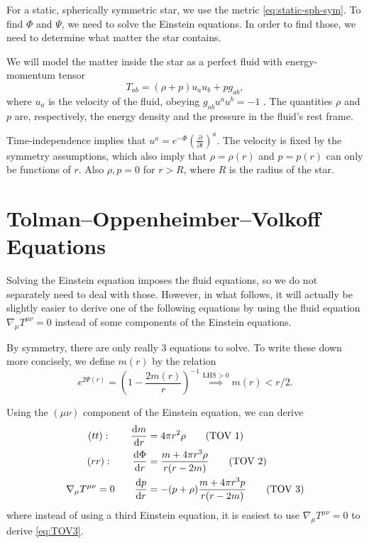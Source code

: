 
For a static, spherically symmetric star, we use the metric \eqref{eq:static-sph-sym}.
To find $\Phi$ and  $\Psi$, we need to solve the Einstein equations. In order to find those, we need to determine what matter the star contains.

We will model the matter inside the star as a perfect fluid with energy-momentum tensor
 \begin{equation}
  T_{ab} = (\rho + p) u_a u_b + p g_{ab},
\end{equation}
where $u_a$ is the velocity of the fluid, obeying  $g_{ab} u^{a} u^{b} = -1$ .
The quantities $\rho$ and $p$  are, respectively, the energy density and the pressure in the fluid's rest frame.

Time-independence implies that $u^{a} = e^{-\Phi} (\frac{\partial }{\partial t})^{a}$.
The velocity is fixed by the symmetry assumptions, which also imply that $\rho = \rho(r)$  and $p = p(r)$  can only be functions of $r$.
Also  $\rho, p = 0$ for  $r > R$, where  $R$  is the radius of the star.

\section{Tolman--Oppenheimber--Volkoff Equations}%
\label{sec:tolman_oppenheimber_volkoff_equations}

Solving the Einstein equation imposes the fluid equations, so we do not separately need to deal with those.
However, in what follows, it will actually be slightly easier to derive one of the following equations by using the fluid equation $\nabla_{\mu} T^{\mu\nu} = 0$  instead of some components of the Einstein equations.

By symmetry, there are only really $3$  equations to solve. To write these down more concisely, we define $m(r)$  by the relation
\begin{equation}
  e^{2 \Psi(r)} = (1 - \frac{2m(r)}{r})^{-1} \stackrel{\text{LHS} > 0}{\implies} m(r) < r / 2.
\end{equation}

\begin{exercise}[Sheet 1]
  Using the $(\mu\nu)$  component of the Einstein equation, we can derive
  \begin{align}
    (tt): \qquad \dv{m}{r} &= 4 \pi r^2 \rho \tag{TOV 1} \label{eq:TOV1} \\
    (rr): \qquad \dv{\Phi}{r} &= \frac{m + 4 \pi r^3 \rho}{r (r - 2m)} \tag{TOV 2} \label{eq:TOV2} \\
    \nabla_{\mu} T^{\mu\nu} = 0 \qquad \dv{p}{r} &= -(p + \rho) \frac{m + 4\pi r^3 p}{r (r - 2m)} \tag{TOV 3} \label{eq:TOV3}
  \end{align}
  where instead of using a third Einstein equation, it is easiest to use $\nabla_{\mu} T^{\mu\nu} = 0$ to derive \eqref{eq:TOV3}.
\end{exercise}

